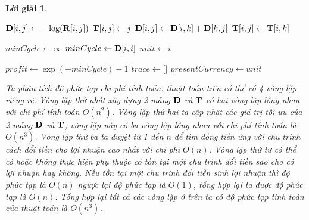 \documentclass[14pt, a4paper]{article}
\theoremstyle{sltheorem}
\theoremstyle{soltheorem}
\newtheorem*{loigiai}{Lời giải}
\begin{document}
\begin{loigiai}
        \begin{algorithm}
            \DontPrintSemicolon

             {
                 {
                    $\bold{D} \lbrack i, j \rbrack \gets -\log (\bold{R} \lbrack i, j \rbrack)$\;
                    $\bold{T} \lbrack i, j \rbrack \gets j$\;
                }
            }
             {
                 {
                     {
                         {
                            $\bold{D} \lbrack i, j \rbrack \gets \bold{D} \lbrack i, k \rbrack + \bold{D} \lbrack k, j \rbrack$\;
                            $\bold{T} \lbrack i, j \rbrack \gets \bold{T} \lbrack i, k \rbrack$
                        }
                    }
                }
            }

            $minCycle \gets \infty$\;
             {
                 {
                    $minCycle \gets \bold{D} \lbrack i, i \rbrack$\;
                    $unit \gets i$\;
                }
            }

             {
                $profit \gets \exp(-minCycle) - 1$\;
                $trace \gets \lbrack \rbrack$\;
                $presentCurrency \gets unit$\;
                \;
            } 
            \caption{Thuật toán tìm cách đổi tiền sinh ra lợi nhuận tốt nhất}
            \label{alg:currency-exchange}
        \end{algorithm}

        Ta phân tích độ phức tạp chi phí tính toán: thuật toán trên có thể có 4 vòng lặp riêng rẽ.
        Vòng lặp thứ nhất xây dựng 2 mảng $\bold{D}$ và $\bold{T}$ có hai vòng lặp lồng nhau với chi phí tính toán $O(n^2)$.
        Vòng lặp thứ hai ta cập nhật các giá trị tối ưu của 2 mảng $\bold{D}$ và $\bold{T}$, vòng lặp này có ba vòng lặp lồng nhau với chi phí tính toán là $O(n^3)$.
        Vòng lặp thứ ba ta duyệt từ 1 đến $n$ để tìm đồng tiền ứng với chu trình cách đổi tiền cho lợi nhuận cao nhất với chi phí $O(n)$.
        Vòng lặp thứ tư có thể có hoặc không thực hiện phụ thuộc có tồn tại một chu trình đổi tiền sao cho có lợi nhuận hay không.
        Nếu tồn tại một chu trình đổi tiền sinh lợi nhuận thì độ phức tạp là $O(n)$ ngược lại độ phức tạp là $O(1)$, tổng hợp lại ta được độ phức tạp là $O(n)$.
        Tổng hợp lại tất cả các vòng lặp ở trên ta có độ phức tạp tính toán của thuật toán là $O(n^3)$.


\end{loigiai}
\end{document}
